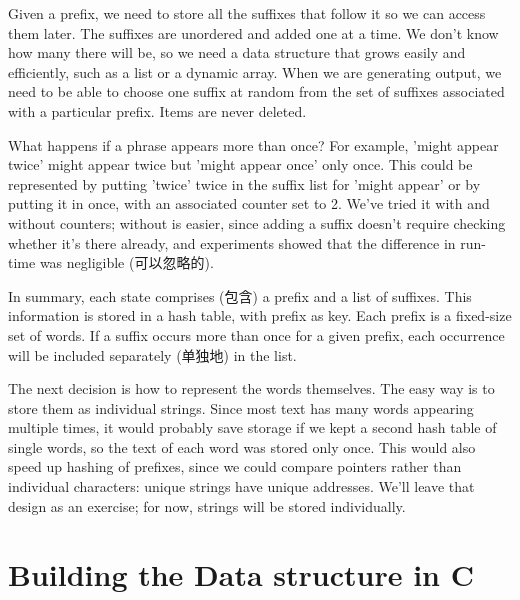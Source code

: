 Given a prefix, we need to store all the suffixes that follow it so we can
access them later. The suffixes are unordered and added one at a time. We
don't know how many there will be, so we need a data structure that grows
easily and efficiently, such as a list or a dynamic array. When we are
generating output, we need to be able to choose one suffix at random from
the set of suffixes associated with a particular prefix. Items are never
deleted.

What happens if a phrase appears more than once? For example, 'might appear
twice' might appear twice but 'might appear once' only once. This could be
represented by putting 'twice' twice in the suffix list for 'might appear'
or by putting it in once, with an associated counter set to 2. We've tried
it with and without counters; without is easier, since adding a suffix
doesn't require checking whether it's there already, and experiments showed
that the difference in run-time was negligible (可以忽略的).

In summary, each state comprises (包含) a prefix and a list of suffixes.
This information is stored in a hash table, with prefix as key. Each prefix
is a fixed-size set of words.  If a suffix occurs more than once for a
given prefix, each occurrence will be included separately (单独地) in the
list.

The next decision is how to represent the words themselves. The easy way is
to store them as individual strings. Since most text has many words
appearing multiple times, it would probably save storage if we kept a
second hash table of single words, so the text of each word was stored only
once. This would also speed up hashing of prefixes, since we could compare
pointers rather than individual characters: unique strings have unique
addresses. We'll leave that design as an exercise; for now, strings will be
stored individually.

\section{Building the Data structure in C}
\label{sec:building_the_data_structure_in_c}

